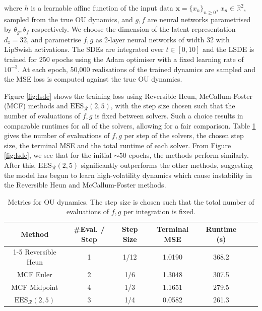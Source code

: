 \documentclass{article} %
\theoremstyle{definition}
\theoremstyle{remark}
\begin{document}
where $h$ is a learnable affine function of the input data $\mathbf{x} = \{x_n\}_{n\geq 0}$, $x_n \in \mathbb{R}^2$, sampled from the true OU dynamics, and $g,f$ are neural networks parametrised by $\theta_g,\theta_f$ respectively. We choose the dimension of the latent representation $d_z = 32$, and parametrise $f,g$ as 2-layer neural networks of width 32 with LipSwish activations. The SDEs are integrated over $t \in [0,10]$ and the LSDE is trained for 250 epochs using the Adam optimiser with a fixed learning rate of $10^{-3}$. At each epoch, 50,000 realisations of the trained dynamics are sampled and the MSE loss is computed against the true OU dynamics.\par\smallskip

Figure \ref{fig:lsde} shows the training loss using Reversible Heun, McCallum-Foster (MCF) methods and $\mathrm{EES}_\mathcal{R}(2,5)$, with the step size chosen such that the number of evaluations of $f,g$ is fixed between solvers. Such a choice results in comparable runtimes for all of the solvers, allowing for a fair comparison. Table \ref{table:lsde} gives the number of evaluations of $f,g$ per step of the solvers, the chosen step size, the terminal MSE and the total runtime of each solver. From Figure \ref{fig:lsde}, we see that for the initial $\sim 50$ epochs, the methods perform similarly. After this, $\mathrm{EES}_\mathcal{R}(2,5)$ significantly outperforms the other methods, suggesting the model has begun to learn high-volatility dynamics which cause instability in the Reversible Heun and McCallum-Foster methods.\par\smallskip

\begin{table}[H]
\centering
    {\renewcommand{\arraystretch}{1.1}
  \begin{tabular}{c|cccccc}
    Method & \#Eval. / Step & Step Size & Terminal MSE & Runtime (s) \\
    \cline{1-5}
    Reversible Heun & 1 & 1/12 & 1.0190 & 368.2\\
    MCF Euler & 2 & 1/6 & 1.3048 & 307.5\\
    MCF Midpoint & 4 & 1/3 & 1.1651 & 279.5\\
    $\mathrm{EES}_\mathcal{R}(2,5)$ & 3 & 1/4 &0.0582 & 261.3\\
  \end{tabular}}
  \caption{Metrics for OU dynamics. The step size is chosen such that the total number of evaluations of $f,g$ per integration is fixed.}
  \label{table:lsde}
\end{table}
\end{document}
